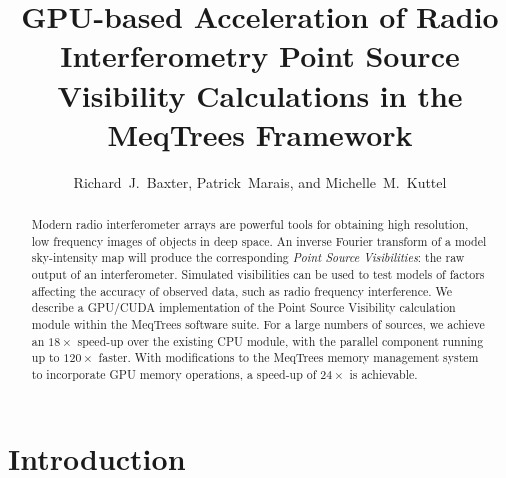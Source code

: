 
\resetcounters




\title{GPU-based Acceleration of Radio Interferometry Point Source
Visibility Calculations in the MeqTrees Framework} 

\author{Richard~J.~Baxter, Patrick~Marais, and Michelle~M.~Kuttel
}

\begin{abstract}
Modern radio interferometer arrays are powerful tools for obtaining high resolution, low frequency images of objects in deep space. An inverse Fourier transform of a model sky-intensity map will produce the corresponding \emph{Point Source Visibilities}:  the raw output of an interferometer. Simulated visibilities can be used to test models of factors affecting the accuracy of observed data, such as radio frequency interference. We describe a GPU/CUDA implementation of the Point Source Visibility calculation module within the MeqTrees software suite.  For a large numbers of sources, we achieve an $18\times$ speed-up over the existing CPU module, with the parallel component running up to $120\times$ faster. With modifications to the MeqTrees memory management system to incorporate GPU memory operations, a speed-up of $24\times$ is achievable.
\end{abstract}


\section{Introduction}

